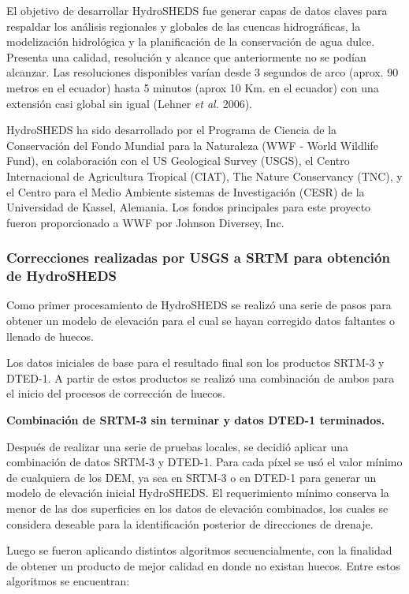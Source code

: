 \documentclass[10pt,a4paper, twoside]{report}
\begin{document}
El objetivo de desarrollar HydroSHEDS fue generar capas de datos claves para respaldar los análisis regionales y globales de las cuencas hidrográficas, la modelización hidrológica y la planificación de la conservación de agua dulce. Presenta una calidad, resolución y alcance que anteriormente no se podían alcanzar. Las resoluciones disponibles varían desde 3 segundos de arco (aprox. 90 metros en el ecuador) hasta 5 minutos (aprox 10 Km. en el ecuador) con una extensión casi global sin igual (Lehner \textit{et al.} 2006).

HydroSHEDS ha sido desarrollado por el Programa de Ciencia de la Conservación del Fondo Mundial para la Naturaleza (WWF - World Wildlife Fund), en colaboración con el US Geological Survey (USGS), el Centro Internacional de Agricultura Tropical (CIAT), The Nature Conservancy (TNC), y el Centro para el Medio Ambiente sistemas de Investigación (CESR) de la Universidad de Kassel, Alemania. Los fondos principales para este proyecto fueron proporcionado a WWF por Johnson Diversey, Inc.

\subsubsection{Correcciones realizadas por USGS a SRTM para obtención de HydroSHEDS}

Como primer procesamiento de HydroSHEDS se realizó una serie de pasos para obtener un modelo de elevación para el cual se hayan corregido datos faltantes o llenado de huecos. 

Los datos iniciales de base para el resultado final son los productos SRTM-3 y DTED-1. A partir de estos productos se realizó una combinación de ambos para el inicio del procesos de corrección de huecos.

\textbf{Combinación de SRTM-3 sin terminar y datos DTED-1 terminados.}

Después de realizar una serie de pruebas locales, se decidió aplicar una combinación de datos SRTM-3 y DTED-1. Para cada píxel se usó el valor mínimo de cualquiera de los DEM, ya sea en SRTM-3 o en DTED-1 para generar un modelo de elevación inicial HydroSHEDS. El requerimiento mínimo conserva la menor de las dos superficies en los datos de elevación combinados, los cuales se considera deseable para la identificación posterior de direcciones de drenaje.

Luego se fueron aplicando distintos algoritmos secuencialmente, con la finalidad de obtener un producto de mejor calidad en donde no existan huecos. Entre estos algoritmos se encuentran:
\end{document}
